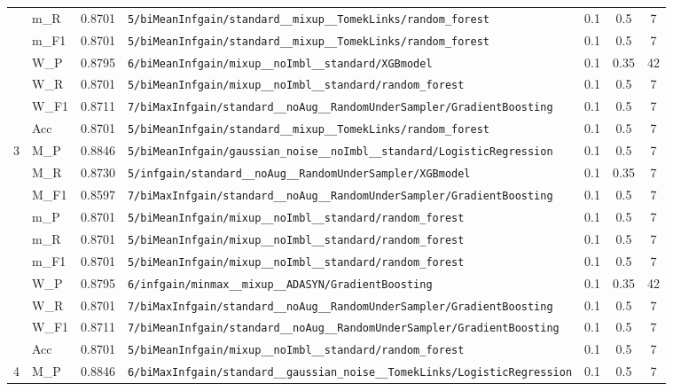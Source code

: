 \begin{table}[htbp]
\begin{tabular}{|c|l|c|>{\ttfamily\footnotesize}p{7.2cm}|c|c|c|}
 & m\_R & 0.8701 & \texttt{5/biMeanInfgain/standard\_\_mixup\_\_TomekLinks/random\_forest} & 0.1 & 0.5  & 7 \\ 
 & m\_F1 & 0.8701 & \texttt{5/biMeanInfgain/standard\_\_mixup\_\_TomekLinks/random\_forest} & 0.1 & 0.5  & 7 \\ 
 & W\_P & 0.8795 & \texttt{6/biMeanInfgain/mixup\_\_noImbl\_\_standard/XGBmodel} & 0.1 & 0.35  & 42 \\ 
 & W\_R & 0.8701 & \texttt{5/biMeanInfgain/mixup\_\_noImbl\_\_standard/random\_forest} & 0.1 & 0.5  & 7 \\ 
 & W\_F1 & 0.8711 & \texttt{7/biMaxInfgain/standard\_\_noAug\_\_RandomUnderSampler/GradientBoosting} & 0.1 & 0.5  & 7 \\ 
 & Acc & 0.8701 & \texttt{5/biMeanInfgain/standard\_\_mixup\_\_TomekLinks/random\_forest} & 0.1 & 0.5  & 7 \\ 
\hline
\multirow{10}{*}{3} & M\_P & 0.8846 & \texttt{5/biMeanInfgain/gaussian\_noise\_\_noImbl\_\_standard/LogisticRegression} & 0.1 & 0.5  & 7 \\ 
 & M\_R & 0.8730 & \texttt{5/infgain/standard\_\_noAug\_\_RandomUnderSampler/XGBmodel} & 0.1 & 0.35  & 7 \\ 
 & M\_F1 & 0.8597 & \texttt{7/biMaxInfgain/standard\_\_noAug\_\_RandomUnderSampler/GradientBoosting} & 0.1 & 0.5  & 7 \\ 
 & m\_P & 0.8701 & \texttt{5/biMeanInfgain/mixup\_\_noImbl\_\_standard/random\_forest} & 0.1 & 0.5  & 7 \\ 
 & m\_R & 0.8701 & \texttt{5/biMeanInfgain/mixup\_\_noImbl\_\_standard/random\_forest} & 0.1 & 0.5  & 7 \\ 
 & m\_F1 & 0.8701 & \texttt{5/biMeanInfgain/mixup\_\_noImbl\_\_standard/random\_forest} & 0.1 & 0.5  & 7 \\ 
 & W\_P & 0.8795 & \texttt{6/infgain/minmax\_\_mixup\_\_ADASYN/GradientBoosting} & 0.1 & 0.35  & 42 \\ 
 & W\_R & 0.8701 & \texttt{7/biMaxInfgain/standard\_\_noAug\_\_RandomUnderSampler/GradientBoosting} & 0.1 & 0.5  & 7 \\ 
 & W\_F1 & 0.8711 & \texttt{7/biMeanInfgain/standard\_\_noAug\_\_RandomUnderSampler/GradientBoosting} & 0.1 & 0.5  & 7 \\ 
 & Acc & 0.8701 & \texttt{5/biMeanInfgain/mixup\_\_noImbl\_\_standard/random\_forest} & 0.1 & 0.5  & 7 \\ 
\hline
\multirow{10}{*}{4} & M\_P & 0.8846 & \texttt{6/biMaxInfgain/standard\_\_gaussian\_noise\_\_TomekLinks/LogisticRegression} & 0.1 & 0.5  & 7 \\ 

\end{tabular}
\end{table}
